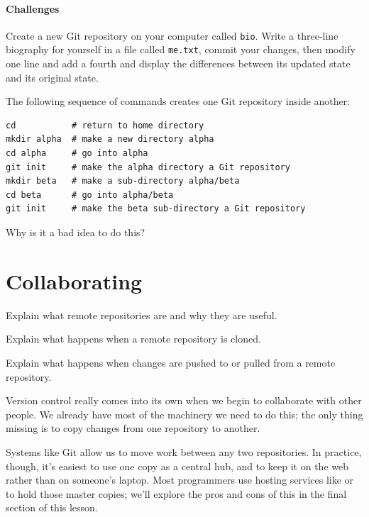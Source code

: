 \documentclass{book}
\begin{document}
\mbox{}\paragraph{Challenges}

\begin{swcenumerate}
\item
  Create a new Git repository on your computer called \texttt{bio}.
  Write a three-line biography for yourself in a file called
  \texttt{me.txt}, commit your changes, then modify one line and add a
  fourth and display the differences between its updated state and its
  original state.
\item
  The following sequence of commands creates one Git repository inside
  another:

\begin{verbatim}
cd           # return to home directory
mkdir alpha  # make a new directory alpha
cd alpha     # go into alpha
git init     # make the alpha directory a Git repository
mkdir beta   # make a sub-directory alpha/beta
cd beta      # go into alpha/beta
git init     # make the beta sub-directory a Git repository
\end{verbatim}

  Why is it a bad idea to do this?
\end{swcenumerate}

\section{Collaborating}

\begin{objectives}
\begin{swcitemize}
\item
  Explain what remote repositories are and why they are useful.
\item
  Explain what happens when a remote repository is cloned.
\item
  Explain what happens when changes are pushed to or pulled from a
  remote repository.
\end{swcitemize}
\end{objectives}

Version control really comes into its own when we begin to collaborate
with other people. We already have most of the machinery we need to do
this; the only thing missing is to copy changes from one repository to
another.

Systems like Git allow us to move work between any two repositories. In
practice, though, it's easiest to use one copy as a central hub, and to
keep it on the web rather than on someone's laptop. Most programmers use
hosting services like  or
 to hold those master copies;
we'll explore the pros and cons of this in the final section of this
lesson.
\end{document}
